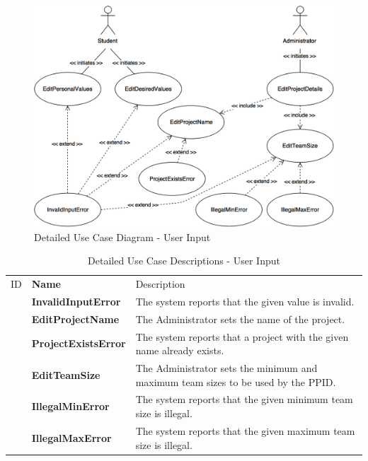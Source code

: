 \documentclass[12pt,letterpaper]{article}
\begin{document}
\begin{figure}[H]
	\centering{}
	\includegraphics[scale=0.3]{imgs/detailed-user-input-use-case-diagram.png}
	\caption{Detailed Use Case Diagram - User Input}
\end{figure}

\begin{table}[H]
	\caption{Detailed Use Case Descriptions - User Input}
	\vspace{1em}
	\begin{tabu} to 
	    \tableheader{}ID & Name & Description\\
		\invalidinputerror{} & InvalidInputError & The system reports that the given value is invalid.\\
		\editprojectname{} & EditProjectName & The Administrator sets the name of the project. \\
		\projectexistserror{} & ProjectExistsError & The system reports that a project with the given name already exists.\\
		\editteamsize{} & EditTeamSize & The Administrator sets the minimum and maximum team sizes to be used by the PPID. \\
		\illegalminerror{} & IllegalMinError & The system reports that the given minimum team size is illegal.\\
		\illegalmaxerror{} & IllegalMaxError & The system reports that the given maximum team size is illegal.\\
	\end{tabu}
\end{table}
\end{document}
